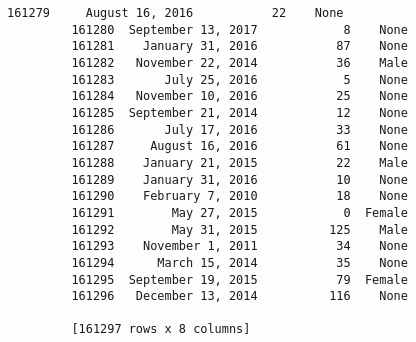 \documentclass[11pt]{article}
\begin{document}
\begin{Verbatim}[commandchars=\\\{\}]
         161279     August 16, 2016           22    None  
         161280  September 13, 2017            8    None  
         161281    January 31, 2016           87    None  
         161282   November 22, 2014           36    Male  
         161283       July 25, 2016            5    None  
         161284   November 10, 2016           25    None  
         161285  September 21, 2014           12    None  
         161286       July 17, 2016           33    None  
         161287     August 16, 2016           61    None  
         161288    January 21, 2015           22    Male  
         161289    January 31, 2016           10    None  
         161290    February 7, 2010           18    None  
         161291        May 27, 2015            0  Female  
         161292        May 31, 2015          125    Male  
         161293    November 1, 2011           34    None  
         161294      March 15, 2014           35    None  
         161295  September 19, 2015           79  Female  
         161296   December 13, 2014          116    None  
         
         [161297 rows x 8 columns]
\end{Verbatim}
            
\end{document}
